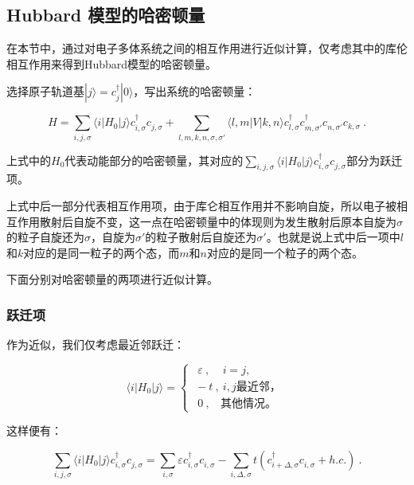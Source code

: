 

\subsection{Hubbard 模型的哈密顿量}

在本节中，通过对电子多体系统之间的相互作用进行近似计算，仅考虑其中的库伦相互作用来得到Hubbard模型的哈密顿量。

选择原子轨道基$|j\rangle =c_j^\dagger |0\rangle$，写出系统的哈密顿量：

\begin{equation}
H=\sum\limits_{i,j,\sigma}\langle i |H_0| j \rangle c_{i,\sigma}^\dagger c_{j,\sigma}^~+\sum\limits_{l,m,k,n,\sigma,\sigma'}\langle l,m|V|k,n\rangle c_{l,\sigma}^\dagger  c_{m,\sigma'}^\dagger c_{n,\sigma'}^~c_{k,\sigma}^~~.
\end{equation}

上式中的$H_0$代表动能部分的哈密顿量，其对应的$\sum\limits_{i,j,\sigma}\langle i |H_0| j \rangle c_{i,\sigma}^\dagger c_{j,\sigma}^~$部分为跃迁项。

上式中后一部分代表相互作用项，由于库仑相互作用并不影响自旋，所以电子被相互作用散射后自旋不变，这一点在哈密顿量中的体现则为发生散射后原本自旋为$\sigma$的粒子自旋还为$\sigma$，自旋为$
\sigma'$的粒子散射后自旋还为$\sigma'$。也就是说上式中后一项中$l$和$k$对应的是同一粒子的两个态，而$m$和$n$对应的是同一个粒子的两个态。

下面分别对哈密顿量的两项进行近似计算。

\subsubsection{跃迁项}
作为近似，我们仅考虑最近邻跃迁：

\begin{equation}
\langle i|H_0|j \rangle=\left\{
\begin{array}{lc}
~~\varepsilon~,~~~~~ i=j, \\
~-t~,~i,j\text{最近邻，} \\
~~0~,~~~~\text{其他情况。}
\end{array}\right.~
\end{equation}

这样便有：

\begin{equation}
\sum\limits_{i,j,\sigma}\langle i|H_0|j \rangle c_{i,\sigma}^\dagger c_{j,\sigma}^~=\sum\limits_{i,\sigma}\varepsilon c_{i,\sigma}^\dagger c_{i,\sigma}^~-\sum\limits_{i,\Delta,\sigma}t\left(c_{i+\Delta,\sigma}^\dagger c_{i,\sigma}^~+h.c.\right)~.
\end{equation}


